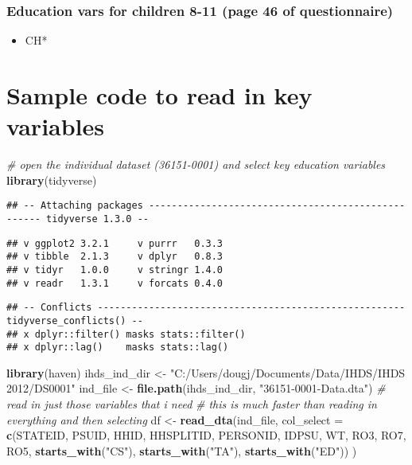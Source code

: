 \documentclass[
]{article}
\newenvironment{Shaded}{\begin{snugshade}}{\end{snugshade}}
\newcommand{\CommentTok}[1]{\textcolor[rgb]{0.56,0.35,0.01}{\textit{#1}}}
\newcommand{\DataTypeTok}[1]{\textcolor[rgb]{0.13,0.29,0.53}{#1}}
\newcommand{\KeywordTok}[1]{\textcolor[rgb]{0.13,0.29,0.53}{\textbf{#1}}}
\newcommand{\NormalTok}[1]{#1}
\newcommand{\StringTok}[1]{\textcolor[rgb]{0.31,0.60,0.02}{#1}}
\providecommand{\tightlist}{%
  \setlength{\itemsep}{0pt}\setlength{\parskip}{0pt}}
\begin{document}
\hypertarget{education-vars-for-children-8-11-page-46-of-questionnaire}{%
\subsubsection{Education vars for children 8-11 (page 46 of
questionnaire)}\label{education-vars-for-children-8-11-page-46-of-questionnaire}}

\begin{itemize}
\tightlist
\item
  CH*
\end{itemize}

\hypertarget{sample-code-to-read-in-key-variables}{%
\section{Sample code to read in key
variables}\label{sample-code-to-read-in-key-variables}}

\begin{Shaded}
\begin{Highlighting}[]
\CommentTok{# open the individual dataset (36151-0001) and select key education variables}
\KeywordTok{library}\NormalTok{(tidyverse)}
\end{Highlighting}
\end{Shaded}

\begin{verbatim}
## -- Attaching packages --------------------------------------------------- tidyverse 1.3.0 --
\end{verbatim}

\begin{verbatim}
## v ggplot2 3.2.1     v purrr   0.3.3
## v tibble  2.1.3     v dplyr   0.8.3
## v tidyr   1.0.0     v stringr 1.4.0
## v readr   1.3.1     v forcats 0.4.0
\end{verbatim}

\begin{verbatim}
## -- Conflicts ------------------------------------------------------ tidyverse_conflicts() --
## x dplyr::filter() masks stats::filter()
## x dplyr::lag()    masks stats::lag()
\end{verbatim}

\begin{Shaded}
\begin{Highlighting}[]
\KeywordTok{library}\NormalTok{(haven)}
\NormalTok{ihds_ind_dir <-}\StringTok{ "C:/Users/dougj/Documents/Data/IHDS/IHDS 2012/DS0001"}
\NormalTok{ind_file <-}\StringTok{ }\KeywordTok{file.path}\NormalTok{(ihds_ind_dir, }\StringTok{"36151-0001-Data.dta"}\NormalTok{)}
\CommentTok{# read in just those variables that i need}
\CommentTok{# this is much faster than reading in everything and then selecting}
\NormalTok{df <-}\StringTok{ }\KeywordTok{read_dta}\NormalTok{(ind_file, }\DataTypeTok{col_select =} \KeywordTok{c}\NormalTok{(STATEID, PSUID, HHID, HHSPLITID, PERSONID, IDPSU, WT, RO3, RO7, RO5, }\KeywordTok{starts_with}\NormalTok{(}\StringTok{"CS"}\NormalTok{), }\KeywordTok{starts_with}\NormalTok{(}\StringTok{"TA"}\NormalTok{), }\KeywordTok{starts_with}\NormalTok{(}\StringTok{"ED"}\NormalTok{)) )}
\end{Highlighting}
\end{Shaded}
\end{document}
